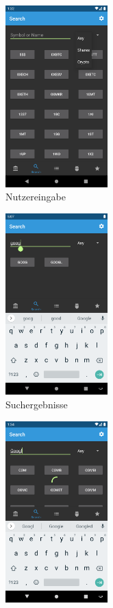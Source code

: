\documentclass[a4paper]{article}
\begin{document}
\begin{figure}[H]
	\begin{subfigure}{.5\textwidth}
		\centering
		\includegraphics[height=7cm,keepaspectratio]{./images/search_type.png}
		\caption{Nutzereingabe}
		\label{fig:functionality:search:overview:full}
	\end{subfigure}
	\begin{subfigure}{.5\textwidth}
		\centering
		\includegraphics[height=7cm,keepaspectratio]{./images/search_done.png}
		\caption{Suchergebnisse}
		\label{fig:functionality:search:overview:results}
	\end{subfigure}
	\begin{subfigure}{.5\textwidth}
		\centering
		\includegraphics[height=7cm,keepaspectratio]{./images/search_loading.png}

\end{subfigure}
\end{figure}
\end{document}
